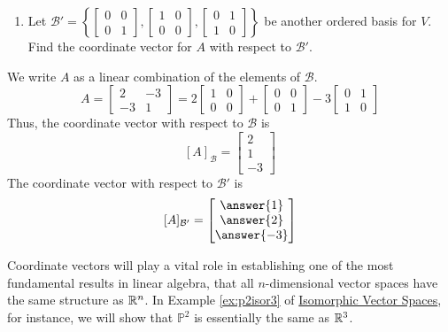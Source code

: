 \documentclass{ximera}
\begin{document}
\begin{example}
\begin{enumerate}
\item 
Let $\mathcal{B}'=\left\{
 \begin{bmatrix}
0 & 0 \\
0 & 1
\end{bmatrix}, 
\begin{bmatrix}
1 & 0 \\
0 & 0
\end{bmatrix},
\begin{bmatrix}
0 & 1 \\
1 & 0
\end{bmatrix}
\right\}$ be another ordered basis for $V$.  Find the coordinate vector for $A$ with respect to $\mathcal{B}'$.
\end{enumerate}
\begin{explanation}
We write $A$ as a linear combination of the elements of $\mathcal{B}$.
$$A=\begin{bmatrix}2&-3\\-3&1\end{bmatrix}=2\begin{bmatrix}1&0\\0&0\end{bmatrix}+\begin{bmatrix}
0 & 0 \\
0 & 1
\end{bmatrix}-3\begin{bmatrix}
0 & 1 \\
1 & 0
\end{bmatrix}$$
Thus, the coordinate vector with respect to $\mathcal{B}$ is
$$[A]_{\mathcal{B}}=\begin{bmatrix}2\\1\\-3\end{bmatrix}$$
The coordinate vector with respect to $\mathcal{B}'$ is
$$[A]_{\mathcal{B}'}=\begin{bmatrix}\answer{1}\\\answer{2}\\\answer{-3}\end{bmatrix}$$
\end{explanation}
\end{example}


Coordinate vectors will play a vital role in establishing one of the most fundamental results in linear algebra, that all $n$-dimensional vector spaces have the same structure as $\mathbb{R}^n$.  In Example \ref{ex:p2isor3} of \href{https://ximera.osu.edu/linearalgebradzv3/LinearAlgebraInteractiveIntro/LTR-0060/main}{Isomorphic Vector Spaces}, for instance, we will show that $\mathbb{P}^2$ is essentially the same as $\mathbb{R}^3$.  
\end{document}
